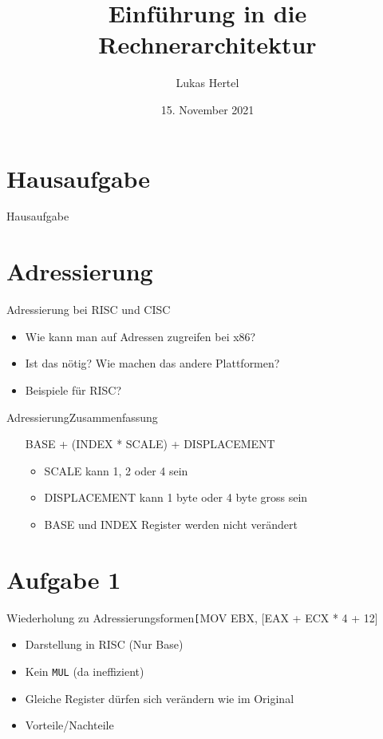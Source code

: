 \documentclass[
  german,            %
  aspectratio=169,    %
  sectionpage=false,   %
]{tumbeamer}
\title{Einführung in die Rechnerarchitektur}
\subtitle{}
\author{Lukas Hertel}
\institute{\theChairName\\\theDepartmentName\\\theUniversityName}
\date[15.11.2021]{15. November 2021}
\begin{document}
\maketitle

\section{Hausaufgabe}
\begin{frame}{Hausaufgabe}
	
\end{frame}
\section{Adressierung}
\begin{frame}{Adressierung bei RISC und CISC}
    \begin{itemize}
        \item Wie kann man auf Adressen zugreifen bei x86?
        \item Ist das nötig? Wie machen das andere Plattformen?
        \item Beispiele für RISC?
    \end{itemize}
\end{frame}
\begin{frame}{Adressierung}{Zusammenfassung}
    \begin{itemize}
        \item [BASE + (INDEX * SCALE) + DISPLACEMENT]
        \begin{itemize}
            \item SCALE kann 1, 2 oder 4 sein
            \item DISPLACEMENT kann 1 byte oder 4 byte gross sein
            \item BASE und INDEX Register werden nicht verändert
        \end{itemize}
    \end{itemize}
\end{frame}
\section{Aufgabe 1}
\begin{frame}{Wiederholung zu Adressierungsformen}{\texttt[MOV EBX, [EAX + ECX * 4 + 12]}
    \begin{itemize}
        \item Darstellung in RISC (Nur Base)
        \item Kein \texttt{MUL} (da ineffizient)
        \item Gleiche Register dürfen sich verändern wie im Original
        \item Vorteile/Nachteile
    \end{itemize}
\end{frame}
\end{document}

